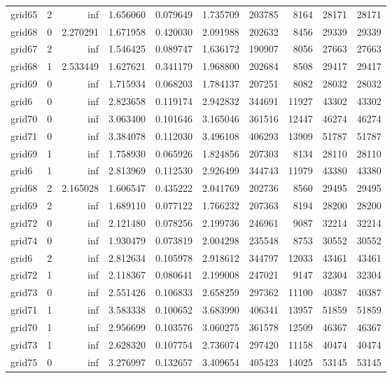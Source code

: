 \begin{longtable}{|l|r|r|r|r|r|r|r|r|r|}
grid65 & 2 & inf & 1.656060 & 0.079649 & 1.735709 & 203785 & 8164 & 28171 & 28171 \\
grid68 & 0 & 2.270291 & 1.671958 & 0.420030 & 2.091988 & 202632 & 8456 & 29339 & 29339 \\
grid67 & 2 & inf & 1.546425 & 0.089747 & 1.636172 & 190907 & 8056 & 27663 & 27663 \\
grid68 & 1 & 2.533449 & 1.627621 & 0.341179 & 1.968800 & 202684 & 8508 & 29417 & 29417 \\
grid69 & 0 & inf & 1.715934 & 0.068203 & 1.784137 & 207251 & 8082 & 28032 & 28032 \\
grid6 & 0 & inf & 2.823658 & 0.119174 & 2.942832 & 344691 & 11927 & 43302 & 43302 \\
grid70 & 0 & inf & 3.063400 & 0.101646 & 3.165046 & 361516 & 12447 & 46274 & 46274 \\
grid71 & 0 & inf & 3.384078 & 0.112030 & 3.496108 & 406293 & 13909 & 51787 & 51787 \\
grid69 & 1 & inf & 1.758930 & 0.065926 & 1.824856 & 207303 & 8134 & 28110 & 28110 \\
grid6 & 1 & inf & 2.813969 & 0.112530 & 2.926499 & 344743 & 11979 & 43380 & 43380 \\
grid68 & 2 & 2.165028 & 1.606547 & 0.435222 & 2.041769 & 202736 & 8560 & 29495 & 29495 \\
grid69 & 2 & inf & 1.689110 & 0.077122 & 1.766232 & 207363 & 8194 & 28200 & 28200 \\
grid72 & 0 & inf & 2.121480 & 0.078256 & 2.199736 & 246961 & 9087 & 32214 & 32214 \\
grid74 & 0 & inf & 1.930479 & 0.073819 & 2.004298 & 235548 & 8753 & 30552 & 30552 \\
grid6 & 2 & inf & 2.812634 & 0.105978 & 2.918612 & 344797 & 12033 & 43461 & 43461 \\
grid72 & 1 & inf & 2.118367 & 0.080641 & 2.199008 & 247021 & 9147 & 32304 & 32304 \\
grid73 & 0 & inf & 2.551426 & 0.106833 & 2.658259 & 297362 & 11100 & 40387 & 40387 \\
grid71 & 1 & inf & 3.583338 & 0.100652 & 3.683990 & 406341 & 13957 & 51859 & 51859 \\
grid70 & 1 & inf & 2.956699 & 0.103576 & 3.060275 & 361578 & 12509 & 46367 & 46367 \\
grid73 & 1 & inf & 2.628320 & 0.107754 & 2.736074 & 297420 & 11158 & 40474 & 40474 \\
grid75 & 0 & inf & 3.276997 & 0.132657 & 3.409654 & 405423 & 14025 & 53145 & 53145 \\

\end{longtable}
